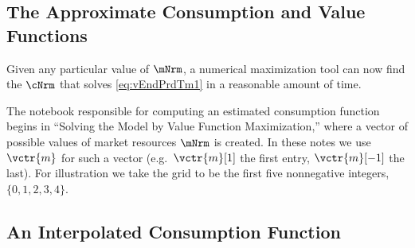 \hypertarget{the-approximate-consumption-and-value-functions}{}
\subsection{The Approximate Consumption and Value Functions}

Given any particular value of $\mNrm$, a numerical maximization tool can now find the $\cNrm$ that solves \eqref{eq:vEndPrdTm1} in a reasonable amount of time.

The notebook responsible for computing an estimated consumption function begins in ``Solving the Model by Value Function Maximization,'' where a vector of possible values of market resources $\mNrm$ is created.  In these notes we use $\vctr{m}$ for such a vector (e.g.\ $\vctr{m}[1]$ the first entry, $\vctr{m}[-1]$ the last).  For illustration we take the grid to be the first five nonnegative integers, $\{0,1,2,3,4\}$.



\hypertarget{an-interpolated-consumption-function}{}
\subsection{An Interpolated Consumption Function} \label{subsec:LinInterp}


